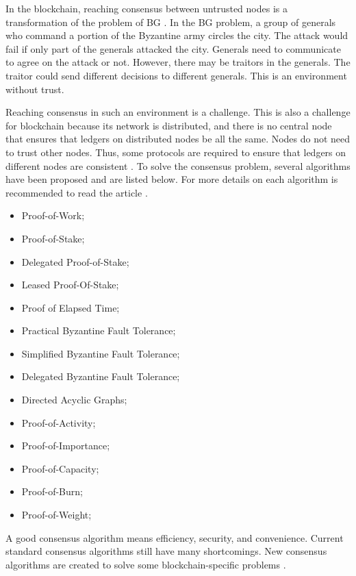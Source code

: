 In the blockchain, reaching consensus between untrusted nodes is a transformation of the problem of \ac{BG} \cite{lamport1982byzantine}. In the BG problem, a group of generals who command a portion of the Byzantine army circles the city. The attack would fail if only part of the generals attacked the city. Generals need to communicate to agree on the attack or not. However, there may be traitors in the generals. The traitor could send different decisions to different generals. This is an environment without trust.

Reaching consensus in such an environment is a challenge. This is also a challenge for blockchain because its network is distributed, and there is no central node that ensures that ledgers on distributed nodes be all the same. Nodes do not need to trust other nodes. Thus, some protocols are required to ensure that ledgers on different nodes are consistent \cite{kostarev2017review}. To solve the consensus problem, several algorithms have been proposed and are listed below. For more details on each algorithm is recommended to read the article \cite{mingxiao2017review}.

\begin{itemize}
\item Proof-of-Work;
\item Proof-of-Stake;
\item Delegated Proof-of-Stake;
\item Leased Proof-Of-Stake;
\item Proof of Elapsed Time;
\item Practical Byzantine Fault Tolerance;
\item Simplified Byzantine Fault Tolerance;
\item Delegated Byzantine Fault Tolerance;
\item Directed Acyclic Graphs;
\item Proof-of-Activity;
\item Proof-of-Importance;
\item Proof-of-Capacity;
\item Proof-of-Burn;
\item Proof-of-Weight;
\end{itemize}

A good consensus algorithm means efficiency, security, and convenience. Current standard consensus algorithms still have many shortcomings. New consensus algorithms are created to solve some blockchain-specific problems \cite{zheng2016blockchain}.

